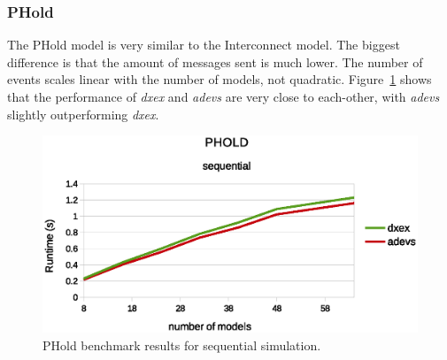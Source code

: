 \subsubsection{PHold}
\label{4-seq-PHold}
The PHold model is very similar to the Interconnect model.
The biggest difference is that the amount of messages sent is much lower.
The number of events scales linear with the number of models, not quadratic.
Figure~\ref{fig:Phold_benchmark} shows that the performance of \textit{dxex} and \textit{adevs} are very close to each-other, with \textit{adevs} slightly outperforming \textit{dxex}.
\begin{figure}
	\center
	\includegraphics[width=\columnwidth]{fig/phold_sequential.eps}
	\caption{PHold benchmark results for sequential simulation.}
	\label{fig:Phold_benchmark}
\end{figure}

